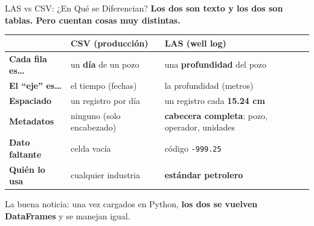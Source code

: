 \documentclass[aspectratio=169, 11pt]{beamer}
\begin{document}
\begin{frame}{LAS vs CSV: ¿En Qué se Diferencian?}
  \vspace{-6pt}
  {\small\color{arcaDark}\bfseries
    Los dos son texto y los dos son tablas. Pero cuentan cosas muy distintas.}

  \vspace{6pt}
  \centering
  {\footnotesize
  \renewcommand{\arraystretch}{1.45}
  \begin{tabular}{@{}p{3.2cm} p{4.1cm} p{4.3cm}@{}}
    \toprule
    & {\bfseries\color{arcaDark} CSV (producción)} & {\bfseries\color{arcaRed} LAS (well log)} \\
    \midrule
    {\bfseries Cada fila es\ldots} & un \textbf{día} de un pozo & una \textbf{profundidad} del pozo \\
    {\bfseries El ``eje'' es\ldots} & el tiempo (fechas) & la profundidad (metros) \\
    {\bfseries Espaciado} & un registro por día & un registro cada \textbf{15.24 cm} \\
    {\bfseries Metadatos} & ninguno (solo encabezado) & \textbf{cabecera completa}: pozo, operador, unidades \\
    {\bfseries Dato faltante} & celda vacía & código \texttt{-999.25} \\
    {\bfseries Quién lo usa} & cualquier industria & \textbf{estándar petrolero} \\
    \bottomrule
  \end{tabular}
  }

  \vspace{8pt}
  {\scriptsize\color{textMuted}
    \faLightbulb[regular]\hspace{3pt}%
    La buena noticia: una vez cargados en Python, \textbf{los dos se vuelven DataFrames} y se manejan igual.}
\end{frame}
\end{document}
